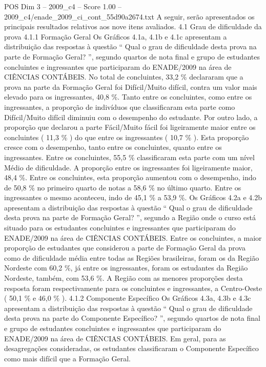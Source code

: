 \begin{textsample}{POS Dim 3 – 2009\_c4 – Score 1.00 – 2009\_c4/enade\_2009\_ci\_cont\_55d90a2674.txt}
A seguir, serão apresentados os principais resultados relativos aos nove itens avaliados. 4.1 Grau de dificuldade da prova 4.1.1 Formação Geral Os Gráficos 4.1a, 4.1b e 4.1c apresentam a distribuição das respostas à questão “ Qual o grau de dificuldade desta prova na parte de Formação Geral? ”, segundo quartos de nota final e grupo de estudantes concluintes e ingressantes que participaram do ENADE/2009 na área de CIÊNCIAS CONTÁBEIS.
No total de concluintes, 33,2 \% declararam que a prova na parte da Formação Geral foi Difícil/Muito difícil, contra um valor mais elevado para os ingressantes, 40,8 \%.
Tanto entre os concluintes, como entre os ingressantes, a proporção de indivíduos que classificaram esta parte como Difícil/Muito difícil diminuiu com o desempenho do estudante.
Por outro lado, a proporção que declarou a parte Fácil/Muito fácil foi ligeiramente maior entre os concluintes ( 11,3 \% ) do que entre os ingressantes ( 10,7 \% ).
Esta proporção cresce com o desempenho, tanto entre os concluintes, quanto entre os ingressantes.
Entre os concluintes, 55,5 \% classificaram esta parte com um nível Médio de dificuldade.
A proporção entre os ingressantes foi ligeiramente maior, 48,4 \%.
Entre os concluintes, esta proporção aumentou com o desempenho, indo de 50,8 \% no primeiro quarto de notas a 58,6 \% no último quarto.
Entre os ingressantes o mesmo aconteceu, indo de 45,1 \% a 53,9 \%.
Os Gráficos 4.2a e 4.2b apresentam a distribuição das respostas à questão “ Qual o grau de dificuldade desta prova na parte de Formação Geral? ”, segundo a Região onde o curso está situado para os estudantes concluintes e ingressantes que participaram do ENADE/2009 na área de CIÊNCIAS CONTÁBEIS.
Entre os concluintes, a maior proporção de estudantes que considerou a parte de Formação Geral da prova como de dificuldade média entre todas as Regiões brasileiras, foram os da Região Nordeste com 60,2 \%, já entre os ingressantes, foram os estudantes da Região Nordeste, também, com 53,6 \%.
A Região com as menores proporções desta resposta foram respectivamente para os concluintes e ingressantes, a Centro-Oeste ( 50,1 \% e 46,0 \% ). 4.1.2 Componente Específico Os Gráficos 4.3a, 4.3b e 4.3c apresentam a distribuição das respostas à questão “ Qual o grau de dificuldade desta prova na parte do Componente Específico? ”, segundo quartos de nota final e grupo de estudantes concluintes e ingressantes que participaram do ENADE/2009 na área de CIÊNCIAS CONTÁBEIS.
Em geral, para as desagregações consideradas, os estudantes classificaram o Componente Específico como mais difícil que a Formação Geral.

\end{textsample}
